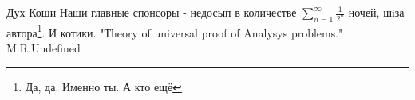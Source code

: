 \begin{thebibliography}{XXXX}
	 Дух Коши
	  Наши главные спонсоры - недосып в количестве $ \sum_{n=1}^{\infty} {\frac{1}{2^n}}$ ночей, шiза автора\footnote{Да, да. Именно ты. А кто ещё}. И котики.
	 "Тheory of universal proof of Analysys problems." M.R.Undefined
\end{thebibliography}